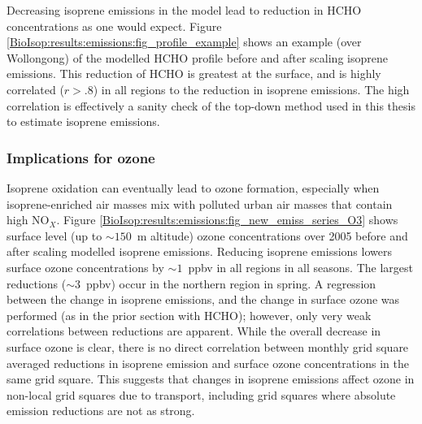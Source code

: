       
      Decreasing isoprene emissions in the model lead to reduction in HCHO concentrations as one would expect.
      Figure \ref{BioIsop:results:emissions:fig_profile_example} shows an example (over Wollongong) of the modelled HCHO profile before and after scaling isoprene emissions.
      This reduction of HCHO is greatest at the surface, and is highly correlated ($r>.8$) in all regions to the reduction in isoprene emissions.
      The high correlation is effectively a sanity check of the top-down method used in this thesis to estimate isoprene emissions.
      
        
  
    \subsubsection{Implications for ozone}
  
      Isoprene oxidation can eventually lead to ozone formation, especially when isoprene-enriched air masses mix with polluted urban air masses that contain high NO$_X$.
      Figure \ref{BioIsop:results:emissions:fig_new_emiss_series_O3} shows surface level (up to $\sim{150}$~m altitude) ozone concentrations over 2005 before and after scaling modelled isoprene emissions.
      Reducing isoprene emissions lowers surface ozone concentrations by $\sim1$~ppbv in all regions in all seasons.
      The largest reductions ($\sim3$~ppbv) occur in the northern region in spring.
      A regression between the change in isoprene emissions, and the change in surface ozone was performed (as in the prior section with HCHO); however, only very weak correlations between reductions are apparent.
      While the overall decrease in surface ozone is clear, there is no direct correlation between monthly grid square averaged reductions in isoprene emission and surface ozone concentrations in the same grid square.
      This suggests that changes in isoprene emissions affect ozone in non-local grid squares due to transport, including grid squares where absolute emission reductions are not as strong.
      
